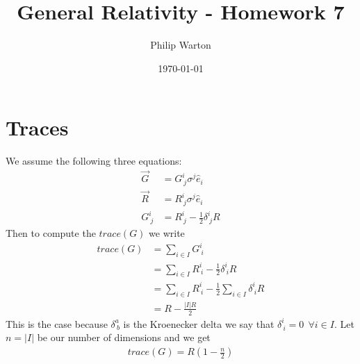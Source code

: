 \documentclass{article}
\theoremstyle{definition}
\begin{document}
\title{General Relativity - Homework 7}
\author{Philip Warton}
\date{\today}
\maketitle
\section{Traces}
We assume the following three equations:
\begin{align*}
\vec G &= G^i_{\ j} \sigma^j \hat e_i \\
\vec R &= R^i_{\ j}\sigma^j \hat e_i \\
G^i_{\ j} &= R^i_{\ j} - \frac{1}{2}\delta^i_{\ j}R
\end{align*}
Then to compute the $trace(G)$ we write 
\begin{align*}
    trace(G) &= \sum_{i \in I}G^i_{\ i} \\
    &= \sum_{i \in I}R^i_{\ i} - \frac{1}{2}\delta^i_{\ i}R \\
    &= \sum_{i \in I}R^i_{\ i} - \frac{1}{2}\sum_{i \in I}\delta^i_{\ i} R\\
    &= R - \frac{|I|R}{2}
\end{align*}
This is the case because $\delta^a_{\ b}$ is the Kroenecker delta we say that $\delta^i_{\ i} = 0 \ \ \forall i \in I$.
Let $n = |I|$ be our number of dimensions and we get 
\begin{align*}
    trace(G) = R\left(1 - \frac{n}{2}\right)
\end{align*}
\end{document}
